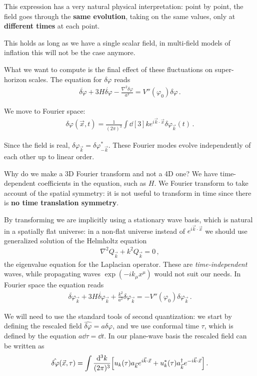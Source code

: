 \documentclass[main.tex]{subfiles}
\begin{document}
This expression has a very natural physical interpretation: point by point, the field goes through the \textbf{same evolution}, taking on the same values, only at \textbf{different times} at each point. 

This holds as long as we have a single scalar field, in multi-field models of inflation this will not be the case anymore. 

What we want to compute is the final effect of these fluctuations on super-horizon scales. 
The equation for \(\delta \varphi \) reads 
%
\begin{align}
\ddot{ \delta \varphi} + 3 H \dot{ \delta \varphi} 
- \frac{\nabla^2 \delta \varphi }{a^2} = V''(\varphi_0 ) \delta \varphi 
\,.
\end{align}

We move to Fourier space: 
%
\begin{align}
\delta \varphi (\vec{x}, t) = \frac{1}{(2\pi )^{3}} \int \dd[3]{k} 
e^{i \vec{k} \cdot \vec{x}} \delta \varphi _{\vec{k}}(t)
\,.
\end{align}

Since the field is real, \(\delta \varphi _{\vec{k}} = \delta \varphi _{- \vec{k}}^{*}\). 
These Fourier modes evolve independently of each other up to linear order. 

Why do we make a 3D Fourier transform and not a 4D one? We have time-dependent coefficients in the equation, such as \(H\). 
We Fourier transform to take account of the spatial symmetry: it is not useful to transform in time since there is \textbf{no time translation symmetry}. 

By transforming we are implicitly using a stationary wave basis, which is natural in a spatially flat universe: in a non-flat universe instead of \(e^{i \vec{k} \cdot \vec{x}}\) we should use generalized solution of the Helmholtz equation 
%
\begin{align}
\nabla^2 Q_{\vec{k}} + k^2 Q_{\vec{k}} = 0
\,,
\end{align}
%
the eigenvalue equation for the Laplacian operator. 
These are \emph{time-independent} waves, while propagating waves \(\exp(- i k_\mu x^{\mu })\) would not suit our needs. 
In Fourier space the equation reads 
%
\begin{align}
\ddot{ \delta \varphi} _{\vec{k}} + 3 H \dot{ \delta \varphi}_{\vec{k}}
+ \frac{k^2}{a^2} \delta \varphi _{\vec{k}} = - V'' (\varphi_0 ) \delta \varphi _{\vec{k}}
\,.
\end{align}

We will need to use the standard tools of second quantization: we start by defining the rescaled field \(\hat{ \delta \varphi} = a \delta \varphi \), and we use conformal time \(\tau \), which is defined by the equation \(a \dd{ \tau } = \dd{t}\).
In our plane-wave basis the rescaled field can be written as 
%
\begin{align}
\hat{\delta \varphi} (\vec{x}, \tau ) = \int \frac{ \dd[3]{k}}{(2 \pi)^3}
\qty[u_k (\tau ) a_{\vec{k}} e^{i \vec{k} \cdot \vec{x}} + u_k^{*} (\tau ) a_{\vec{k}}^\dag e^{-i \vec{k} \cdot \vec{x}}] 
\,.
\end{align}
\end{document}
